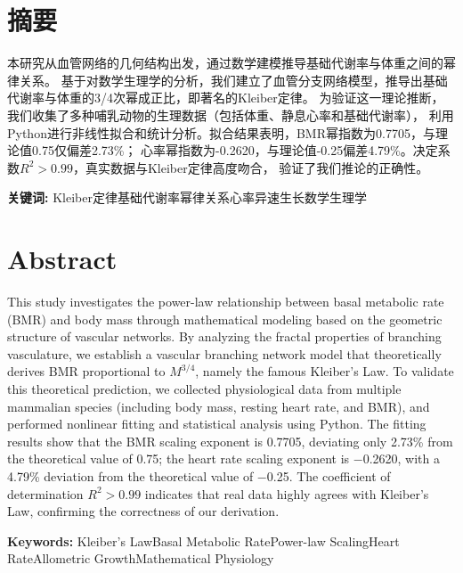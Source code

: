 \section*{ \centering 摘要}

\vskip 0.5cm

本研究从血管网络的几何结构出发，通过数学建模推导基础代谢率与体重之间的幂律关系。
基于对数学生理学的分析，我们建立了血管分支网络模型，推导出基础代谢率与体重的3/4次幂成正比，即著名的Kleiber定律。
为验证这一理论推断，我们收集了多种哺乳动物的生理数据（包括体重、静息心率和基础代谢率），
利用Python进行非线性拟合和统计分析。拟合结果表明，BMR幂指数为0.7705，与理论值0.75仅偏差2.73\%；
心率幂指数为-0.2620，与理论值-0.25偏差4.79\%。决定系数$R^2 > 0.99$，真实数据与Kleiber定律高度吻合，
验证了我们推论的正确性。

\textbf{关键词:} Kleiber定律\quad 基础代谢率\quad 幂律关系\quad 心率\quad 异速生长\quad 数学生理学

\clearpage
\section*{ \centering \textbf{Abstract} }

This study investigates the power-law relationship between basal metabolic rate (BMR) and body mass through 
mathematical modeling based on the geometric structure of vascular networks. 
By analyzing the fractal properties of branching vasculature, we establish a vascular branching network model 
that theoretically derives BMR proportional to $M^{3/4}$, namely the famous Kleiber's Law. 
To validate this theoretical prediction, we collected physiological data from multiple mammalian species 
(including body mass, resting heart rate, and BMR), and performed nonlinear fitting and statistical analysis using Python. 
The fitting results show that the BMR scaling exponent is 0.7705, deviating only 2.73\% from the theoretical value of 0.75; 
the heart rate scaling exponent is $-$0.2620, with a 4.79\% deviation from the theoretical value of $-$0.25. 
The coefficient of determination $R^2 > 0.99$ indicates that real data highly agrees with Kleiber's Law, 
confirming the correctness of our derivation.

\vskip 0.2cm
\noindent\textbf{Keywords:} Kleiber's Law\quad Basal Metabolic Rate\quad Power-law Scaling\quad Heart Rate\quad Allometric Growth\quad Mathematical Physiology
